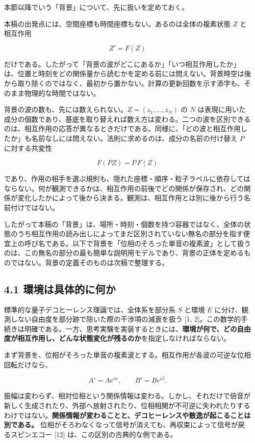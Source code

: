 \documentclass[
  a4paper,
]{ltjsarticle}
\begin{document}
本節以降でいう「背景」について、先に扱いを定めておく。

本稿の出発点には、空間座標も時間座標もない。あるのは全体の複素状態 \(Z\)
と相互作用

\[
Z'=F(Z)
\]

だけである。したがって「背景の波がどこにあるか」「いつ相互作用したか」は、位置と時刻をどの関係量から読むかを定める前には問えない。背景時空は後から取り除くのではなく、最初から置かない。計算の更新回数を示す添字も、そのまま物理的な時間ではない。

背景の波の数も、先には数えられない。\(Z=(z_1,\ldots,z_N)\) の \(N\)
は表現に用いた成分の個数であり、基底を取り替えれば数え方は変わる。二つの波を区別できるのは、相互作用の応答が異なるときだけである。同様に、「どの波と相互作用したか」も名前なしには問えない。法則に求めるのは、成分の名前の付け替え
\(P\) に対する共変性

\[
F(PZ)=P\,F(Z)
\]

であり、作用の相手を選ぶ規則も、隠れた座標・順序・粒子ラベルに依存してはならない。何が観測できるかは、相互作用の前後でどの関係が保存され、どの関係が変化したかによって後から決まる。観測は、相互作用とは別に後から行う名前付けではない。

したがって本稿の「背景」は、場所・時刻・個数を持つ容器ではなく、全体の状態のうち相互作用の読み出しによってまだ区別されていない無名の部分を指す便宜上の呼び名である。以下で背景を「位相のそろった単音の複素波」として扱うのは、この無名の部分の最も簡単な説明用モデルであり、背景の正体を定めるものではない。背景の定義そのものは次稿で整理する。

\subsection{4.1
環境は具体的に何か}\label{ux74b0ux5883ux306fux5177ux4f53ux7684ux306bux4f55ux304b}

標準的な量子デコヒーレンス理論では、全体系を部分系 \(S\) と環境 \(E\)
に分け、観測しない自由度を部分跡で除いた際の干渉項の減衰を扱う {[}1,
2{]}。この数学的手続きは明確である。一方、思考実験を実装するときには、\textbf{環境が何で、どの自由度が相互作用し、どんな状態変化が残るのか}を指定しなければならない。

まず背景を、位相がそろった単音の複素波とする。相互作用が各波の可逆な位相回転だけなら、

\[
A'=Ae^{i\alpha},\qquad B'=Be^{i\beta}.
\]

振幅は変わらず、相対位相という関係情報は変わる。しかし、それだけで倍音が新しく生成されたり、外部へ放射されたり、位相相関が不可逆に失われたりするわけではない。\textbf{関係情報が変わることと、デコヒーレンスや散逸が起こることは別である。}
位相がそろわなくなって信号が消えても、再収束によって信号が戻るスピンエコー
{[}12{]} は、この区別の古典的な例である。
\end{document}
